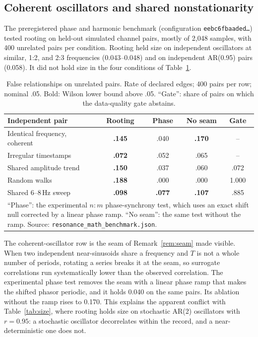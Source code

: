 \documentclass[10pt,twocolumn,letterpaper]{article}
\theoremstyle{definition}
\theoremstyle{remark}
\newcommand{\code}[1]{\texttt{#1}}
\begin{document}
\subsection{Coherent oscillators and shared nonstationarity}

The preregistered phase and harmonic benchmark (configuration
\code{eebc6fbaaded\ldots}) tested rooting on held-out simulated channel pairs,
mostly of 2,048 samples, with 400 unrelated pairs per condition. Rooting held
size on independent oscillators at similar, 1:2, and 2:3 frequencies
(0.043--0.048) and on independent AR(0.95) pairs (0.058). It did not hold size in
the four conditions of Table~\ref{tab:coherent}.

\begin{table}[t]
\centering\footnotesize
\caption{False relationships on unrelated pairs. Rate of declared edges; 400
pairs per row; nominal .05. Bold: Wilson lower bound above .05. ``Gate'':
share of pairs on which the data-quality gate abstains.}
\label{tab:coherent}
\setlength{\tabcolsep}{3pt}
\begin{tabular}{@{}lcccc@{}}
\toprule
Independent pair & Rooting & Phase & No seam & Gate\\
\midrule
Identical frequency, coherent & \textbf{.145} & .040 & \textbf{.170} & --\\
Irregular timestamps & \textbf{.072} & .052 & .065 & --\\
Shared amplitude trend & \textbf{.150} & .037 & .060 & .072\\
Random walks & \textbf{.188} & .000 & .000 & 1.000\\
Shared 6--8\,Hz sweep & \textbf{.098} & \textbf{.077} & \textbf{.107} & .885\\
\bottomrule
\multicolumn{5}{p{0.95\columnwidth}}{\scriptsize ``Phase'': the experimental
$n{:}m$ phase-synchrony test, which uses an exact shift null corrected by a
linear phase ramp. ``No seam'': the same test without the ramp. Source:
\code{resonance\_math\_benchmark.json}.}
\end{tabular}
\end{table}

The coherent-oscillator row is the seam of Remark~\ref{rem:seam} made visible.
When two independent near-sinusoids share a frequency and $T$ is not a whole
number of periods, rotating a series breaks it at the seam, so surrogate
correlations run systematically lower than the observed correlation. The
experimental phase test removes the seam with a linear phase ramp that makes
the shifted phasor periodic, and it holds 0.040 on the same pairs. Its ablation
without the ramp rises to 0.170. This explains the apparent conflict with
Table~\ref{tab:size}, where rooting holds size on stochastic AR(2) oscillators
with $r=0.95$: a stochastic oscillator decorrelates within the record, and a
near-deterministic one does not.
\end{document}
